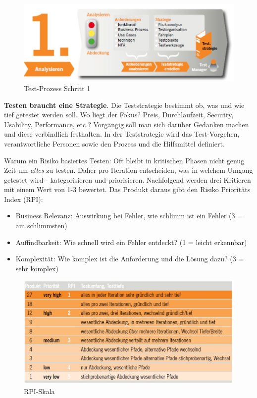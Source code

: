 \begin{figure}[h!]
\centering
\includegraphics[width=0.7\linewidth]{fig/test-prozess-schritt-1}
\caption{Test-Prozess Schritt 1}
\label{fig:test-prozess-schritt-1}
\end{figure}

\textbf{Testen braucht eine Strategie}. Die Teststrategie bestimmt ob, was und wie tief getestet werden soll. Wo liegt der Fokus? Preis, Durchlaufzeit, Security, Usability, Performance, etc.? Vorgängig soll man sich darüber Gedanken machen und diese verbindlich festhalten. In der Teststrategie wird das Test-Vorgehen, verantwortliche Personen sowie den Prozess und die Hilfsmittel definiert. 

Warum ein Risiko basiertes Testen: Oft bleibt in kritischen Phasen nicht genug Zeit um \emph{alles} zu testen. Daher pro Iteration entscheiden, was in welchem Umgang getestet wird - kategorisieren und priorisieren. Nachfolgend werden drei Kritieren mit einem Wert von 1-3 bewertet. Das Produkt daraus gibt den Risiko Prioritäts Index (RPI):

\begin{itemize}
	\item Business Relevanz: Auswirkung bei Fehler, wie schlimm ist ein Fehler (3 = am schlimmsten)
	\item Auffindbarkeit: Wie schnell wird ein Fehler entdeckt? (1 = leicht erkennbar)
	\item Komplexität: Wie komplex ist die Anforderung und die Lösung dazu? (3 = sehr komplex)
\end{itemize}

\begin{figure}[h!]
\centering
\includegraphics[width=0.8\linewidth]{fig/rpi-skala}
\caption{RPI-Skala}
\label{fig:rpi-skala}
\end{figure}

